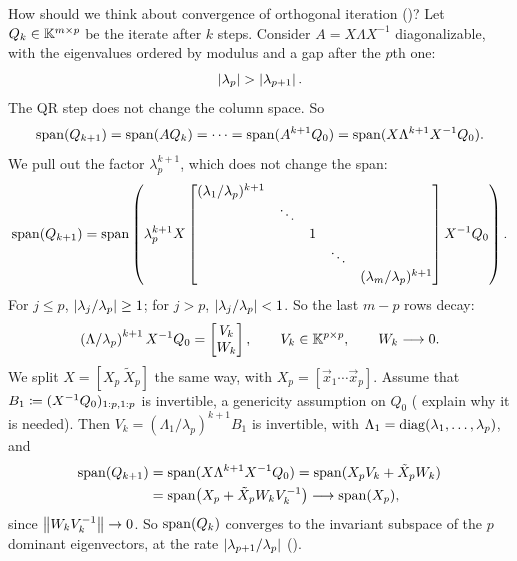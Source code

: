 How should we think about convergence of orthogonal iteration ()? Let $Q_k \in \mathbb{K}^{m \times p}$ be the iterate after $k$ steps. Consider $A = X\Lambda X^{-1}$ diagonalizable, with the eigenvalues ordered by modulus and a gap after the $p$th one:
\begin{equation}
  \left\lvert \lambda_p \right\rvert > \left\lvert \lambda_{p+1} \right\rvert.
  \label{eq:orth-iter-gap}
\end{equation}
The QR step does not change the column space. So
\begin{equation}
  \operatorname{span}(Q_{k+1}) = \operatorname{span}(AQ_k) = \dots = \operatorname{span}(A^{k+1}Q_0) = \operatorname{span}(X\Lambda^{k+1}X^{-1}Q_0).
\end{equation}
We pull out the factor $\lambda_p^{k+1}$, which does not change the span:
\begin{equation}
  \operatorname{span}(Q_{k+1}) = \operatorname{span}\left(\lambda_p^{k+1}X\begin{bmatrix}
    (\lambda_1/\lambda_p)^{k+1} & & & & \\
    & \ddots & & & \\
    & & 1 & & \\
    & & & \ddots & \\
    & & & & (\lambda_m/\lambda_p)^{k+1}
  \end{bmatrix}X^{-1}Q_0\right).
\end{equation}
For $j \le p$, $\left\lvert \lambda_j/\lambda_p \right\rvert \ge 1$; for $j > p$, $\left\lvert \lambda_j/\lambda_p \right\rvert < 1$. So the last $m - p$ rows decay:
\begin{equation}
  \left(\Lambda/\lambda_p\right)^{k+1}X^{-1}Q_0 = \begin{bmatrix} V_k \\ W_k \end{bmatrix}, \qquad V_k \in \mathbb{K}^{p \times p}, \qquad W_k \longrightarrow 0.
\end{equation}
We split $X = [X_p\ \tilde{X}_p]$ the same way, with $X_p = [\vec{x}_1 \cdots \vec{x}_p]$. Assume that $B_1 \coloneqq (X^{-1}Q_0)_{1:p,1:p}$ is invertible, a genericity assumption on $Q_0$ ( explain why it is needed). Then $V_k = (\Lambda_1/\lambda_p)^{k+1}B_1$ is invertible, with $\Lambda_1 = \operatorname{diag}(\lambda_1, \dots, \lambda_p)$, and
\begin{equation}
  \begin{aligned}
    \operatorname{span}(Q_{k+1}) &= \operatorname{span}(X\Lambda^{k+1}X^{-1}Q_0) = \operatorname{span}(X_pV_k + \tilde{X}_pW_k) \\
    &= \operatorname{span}\bigl(X_p + \tilde{X}_pW_kV_k^{-1}\bigr) \longrightarrow \operatorname{span}(X_p),
  \end{aligned}
  \label{eq:orth-iter-split}
\end{equation}
since $\left\lVert W_kV_k^{-1} \right\rVert \to 0$.
So $\operatorname{span}(Q_k)$ converges to the invariant subspace of the $p$ dominant eigenvectors, at the rate $\left\lvert \lambda_{p+1}/\lambda_p \right\rvert$ ().

